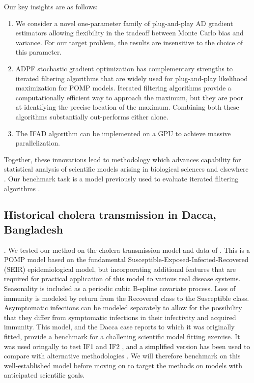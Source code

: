 \documentclass[9pt,twocolumn,twoside]{pnas-new}
\begin{document}
Our key insights are as follows:
\begin{enumerate}
\item We consider a novel one-parameter family of plug-and-play AD gradient estimators allowing flexibility in the tradeoff between Monte Carlo bias and variance. For our target problem, the results are insensitive to the choice of this parameter.
 
\item ADPF stochastic gradient optimization has complementary strengths to iterated filtering algorithms that are widely used for plug-and-play likelihood maximization for POMP models. Iterated filtering algorithms provide a computationally efficient way to approach the maximum, but they are poor at identifying the precise location of the maximum.
Combining both these algorithms substantially out-performs either alone.

\item The IFAD algorithm can be implemented on a GPU to achieve massive parallelization. 
\end{enumerate}
Together, these innovations lead to methodology which advances capability for statistical analysis of scientific models arising in biological sciences and elsewhere .
Our benchmark task is a model previously used to evaluate iterated filtering algorithms .


\subsection*{Historical cholera transmission in Dacca, Bangladesh}.
We tested our method on the cholera transmission model and data of \citep{king08}.
This is a POMP model based on the fundamental Susceptible-Exposed-Infected-Recovered (SEIR) epidemiological model, but incorporating additional features that are required for practical application of this model to various real disease systems.
Seasonality is included as a periodic cubic B-spline covariate process.
Loss of immunity is modeled by return from the Recovered class to the Susceptible class.
Asymptomatic infections can be modeled separately to allow for the possibility that they differ from symptomatic infections in their infectivity and acquired immunity.
This model, and the Dacca case reports to which it was originally fitted, provide a benchmark for a challening scientific model fitting exercise.
It was used oringally to test IF1 \citep{ionides06-pnas} and IF2  \citep{ionides15}, and a simplified version has been used to compare with alternative methodologies \citep{fasiolo16}.
We will therefore benchmark on this well-established model before moving on to target the methods on models with anticipated scientific goals.
\end{document}
